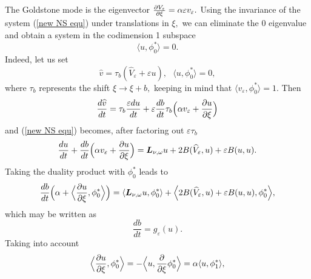 \documentclass[11pt]{article}
\begin{document}



The Goldstone mode is the eigenvector $\frac{\partial V_{\varepsilon }}{%
\partial \xi }=\alpha \varepsilon v_{\varepsilon }.$ Using the invariance of
the system (\ref{new NS equ}) under translations in $\xi ,$ we can eliminate
the $0$ eigenvalue and obtain a system in the codimension 1 subspace%
\begin{equation*}
\langle u,\phi _{0}^{\ast }\rangle =0.
\end{equation*}%
Indeed, let us set%
\begin{equation}
\widehat{v}=\tau _{b}(\widehat{V}_{\varepsilon }+\varepsilon u),\text{ }%
\langle u,\phi _{0}^{\ast }\rangle =0,  \label{def shift mode}
\end{equation}%
where $\tau _{b}$ represents the shift $\xi \rightarrow \xi +b,$ 
keeping in mind that
$\langle v_{\varepsilon },\phi _{0}^{\ast }\rangle =1$.
Then 
\begin{equation*}
\frac{d\widehat{v}}{dt}=\tau _{b}\frac{\varepsilon du}{dt}+\varepsilon \frac{%
db}{dt}\tau _{b} \Bigl( \alpha v_{\varepsilon }+\frac{\partial u}{\partial \xi } \Bigr)
\end{equation*}%
and (\ref{new NS equ}) becomes, after factoring out $\varepsilon \tau _{b}$%
\begin{equation}
\frac{du}{dt}+\frac{db}{dt} \Bigl( \alpha v_{\varepsilon }+\frac{\partial u}{%
\partial \xi } \Bigr)=\boldsymbol{L}_{\nu ,\omega }u+2B(\widehat{V}_{\varepsilon
},u)+\varepsilon B(u,u).  \label{decomp NS}
\end{equation}%
Taking the duality product with $\phi _{0}^{\ast }$ leads to%
\begin{equation}
\frac{db}{dt} \Bigl( \alpha + \Bigl\langle \frac{\partial u}{\partial \xi },\phi
_{0}^{\ast } \Bigr\rangle \Bigr)=\langle \boldsymbol{L}_{\nu ,\omega }u,\phi _{0}^{\ast
}\rangle + \Bigl\langle 2B(\widehat{V}_{\varepsilon },u)+\varepsilon B(u,u),\phi
_{0}^{\ast } \Bigr\rangle ,  \label{equ ba}
\end{equation}%
which may be written as%
\begin{equation}
\frac{db}{dt}=g_{\varepsilon }(u).  \label{equ b}
\end{equation}%
Taking into account 
\begin{equation*}
\Bigl\langle \frac{\partial u}{\partial \xi },\phi _{0}^{\ast } \Bigr\rangle 
= -\Bigl\langle
u,\frac{\partial }{\partial \xi }\phi _{0}^{\ast } \Bigr\rangle =\alpha \langle
u,\phi _{1}^{\ast } \rangle ,
\end{equation*}%
\end{document}
